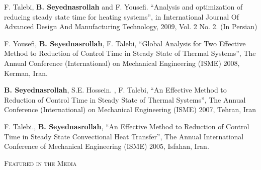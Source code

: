 \documentclass[10pt]{article}
\newenvironment{changemargin}[2]{%
  \begin{list}{}{%
 \setlength{\topsep}{0pt}%
 \setlength{\leftmargin}{#1}%
 \setlength{\rightmargin}{#2}%
 \setlength{\listparindent}{\parindent}%
 \setlength{\itemindent}{\parindent}%
 \setlength{\parsep}{\parskip}%
  }%
  \item[]}{\end{list}
}
\newcommand{\lineover}{
  \begin{changemargin}{-0.05in}{-0.05in}
  \vspace*{-8pt}
  \hrulefill \\
  \vspace*{-2pt}
  \end{changemargin}
}
\newcommand{\header}[1]{
  \begin{changemargin}{-0.5in}{-0.5in}
  \scshape{#1}\\
  \lineover
  \end{changemargin}
}
\newenvironment{body} {
  \vspace*{-2pt}
  \begin{changemargin}{-0.5in}{-0.5in}
}
{\end{changemargin}
}
\begin{document}
\begin{body}
\begin{etaremune}
    \item F. Talebi, \textbf{B. Seyednasrollah} and F. Yousefi. ``Analysis and optimization of reducing steady state time for heating systems'', in International Journal Of Advanced Design And Manufacturing Technology, 2009, Vol. 2 No. 2.  (In Persian)\\
    \medskip

    \item F. Yousefi, \textbf{B. Seyednasrollah}, F. Talebi, ``Global Analysis for Two Effective Method to Reduction of Control Time in Steady State of Thermal Systems'', The Annual Conference (International) on Mechanical Engineering (ISME) 2008, Kerman, Iran. \\
    \medskip

    \item \textbf{B. Seyednasrollah}, S.E. Hossein. , F. Talebi, ``An Effective Method to Reduction of Control Time in Steady State of Thermal Systems'', The Annual Conference (International) on Mechanical Engineering (ISME) 2007, Tehran, Iran\\
    \medskip

    \item F. Talebi., \textbf{B. Seyednasrollah}, ``An Effective Method to Reduction of Control Time in Steady State Convectional Heat Transfer'', The Annual International Conference of Mechanical Engineering (ISME) 2005, Isfahan, Iran.\\
    \medskip

  \end{etaremune}

\end{body}

\medskip


\header{Featured in the Media}
\end{document}

